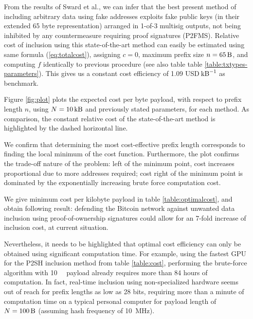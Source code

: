\documentclass[a4paper,11pt,titlepage]{scrbook}
\begin{document}
From the results of Sward et al., we can infer that the best present method of including arbitrary data using fake addresses exploits fake public keys (in their extended 65 byte representation) arranged in 1-of-3 multisig outputs, not being inhibited by any countermeasure requiring proof signatures (P2FMS). \cite[cf.~also table 3]{sward_data_2018}
Relative cost of inclusion using this state-of-the-art method can easily be estimated using same formula (\ref{eq:totalcost}), assigning $c=0$, maximum prefix size $n=\SI{65}{\byte}$, and computing $f$ identically to previous procedure (see also table table \ref{table:txtypes-parameters}).
This gives us a constant cost efficiency of \num{1.09} USD$\,\si{\per\kilo\byte}$ as benchmark.

Figure \ref{fig:plot} plots the expected cost per byte payload, with respect to prefix length $n$, using $N=\SI{10}{\kilo\byte}$ and previously stated parameters, for each method.
As comparison, the constant relative cost of the state-of-the-art method is highlighted by the dashed horizontal line. 

We confirm that determining the most cost-effective prefix length corresponds to finding the local minimum of the cost function.
Furthermore, the plot confirms the trade-off nature of the problem: left of the minimum point, cost increases proportional due to more addresses required; cost right of the minimum point is dominated by the exponentially increasing brute force computation cost.

We give minimum cost per kilobyte payload in table \ref{table:optimalcost},
and obtain following result: 
defending the Bitcoin network against unwanted data inclusion using proof-of-ownership signatures could allow for an 7-fold increase of inclusion cost, at current situation.

Nevertheless, it needs to be highlighted that optimal cost efficiency can only be obtained using significant computation time.
For example, using the fastest GPU for the P2SH inclusion method from table \ref{table:cost}, performing the brute-force algorithm with \SI{10}{\kilo\byte} payload already requires more than 84 hours of computation.
In fact, real-time inclusion using non-specialized hardware seems out of reach for prefix lengths as low as 28 bits, requiring more than a minute of computation time on a typical personal computer for payload length of $N=\SI{100}{\byte}$ (assuming hash frequency of \SI{10}{\mega\hertz}).
\end{document}
